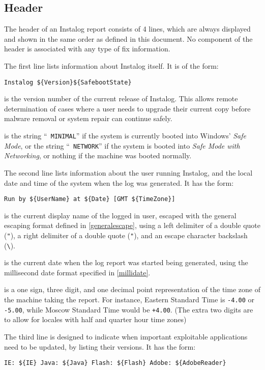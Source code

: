 \subsection{Header}
The header of an Instalog report consists of 4 lines, which are always displayed
and shown in the same order as defined in this document. No component of the
header is associated with any type of fix information.

The first line lists information about Instalog itself. It is of the form:
\begin{verbatim}
Instalog ${Version}${SafebootState}
\end{verbatim}

 is the version number of the current release of Instalog. This
allows remote determination of cases where a user needs to upgrade their current
copy before malware removal or system repair can continue safely.

 is the string ``\verb| MINIMAL|'' if the system is currently
booted into Windows' \textit{Safe Mode}, or the string ``\verb| NETWORK|'' if
the system is booted into \textit{Safe Mode with Networking}, or nothing if the
machine was booted normally.

The second line lists information about the user running Instalog, and the local
date and time of the system when the log was generated. It has the form:
\begin{verbatim}
Run by ${UserName} at ${Date} [GMT ${TimeZone}]
\end{verbatim}

 is the current display name of the logged in user, escaped with
the general escaping format defined in \ref{generalescape}, using a left
delimiter of a double quote (\verb|"|), a right delimiter of a double
quote (\verb|"|), and an escape character backslash (\verb|\|).

 is the current date when the log report was started being generated,
using the millisecond date format specified in \ref{millidate}.

 is a one sign, three digit, and one decimal point representation
of the time zone of the machine taking the report. For instance, Eastern
Standard Time is \verb|-4.00| or \verb|-5.00|, while Moscow Standard Time would
be \verb|+4.00|. (The extra two digits are to allow for locales with half and
quarter hour time zones)

The third line is designed to indicate when important exploitable applications
need to be updated, by listing their versions. It has the form:
\begin{verbatim}
IE: ${IE} Java: ${Java} Flash: ${Flash} Adobe: ${AdobeReader}
\end{verbatim}

